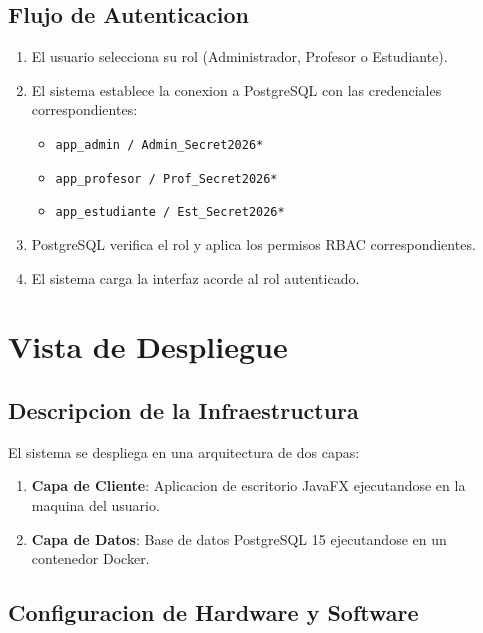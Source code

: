 \documentclass[12pt,a4paper]{article}
\begin{document}
\subsection{Flujo de Autenticacion}

\begin{enumerate}
    \item El usuario selecciona su rol (Administrador, Profesor o Estudiante).
    \item El sistema establece la conexion a PostgreSQL con las credenciales correspondientes:
    \begin{itemize}
        \item \texttt{app\_admin / Admin\_Secret2026*}
        \item \texttt{app\_profesor / Prof\_Secret2026*}
        \item \texttt{app\_estudiante / Est\_Secret2026*}
    \end{itemize}
    \item PostgreSQL verifica el rol y aplica los permisos RBAC correspondientes.
    \item El sistema carga la interfaz acorde al rol autenticado.
\end{enumerate}

\newpage
\section{Vista de Despliegue}

\subsection{Descripcion de la Infraestructura}

El sistema se despliega en una arquitectura de dos capas:

\begin{enumerate}
    \item \textbf{Capa de Cliente}: Aplicacion de escritorio JavaFX ejecutandose en la maquina del usuario.
    \item \textbf{Capa de Datos}: Base de datos PostgreSQL 15 ejecutandose en un contenedor Docker.
\end{enumerate}

\subsection{Configuracion de Hardware y Software}
\end{document}
